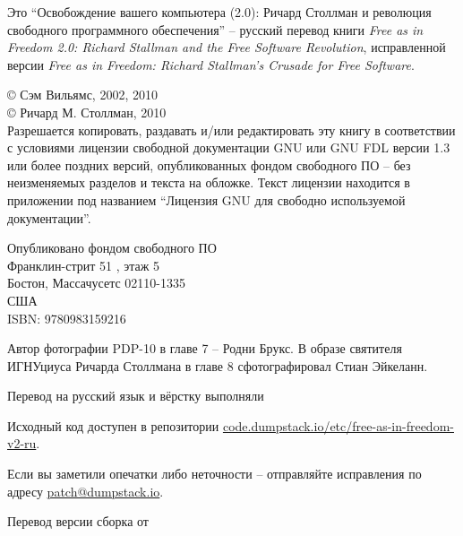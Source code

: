 \thispagestyle{plain}

\noindent Это \enquote{Освобождение вашего компьютера (2.0): Ричард Столлман и революция свободного программного обеспечения} -- русский перевод книги \textit{Free as in Freedom 2.0: Richard Stallman and the Free Software Revolution}, исправленной версии \textit{Free as in Freedom: Richard Stallman's Crusade for Free Software}.

\bigskip

\noindent \copyright{} Сэм Вильямс, 2002, 2010\\
\copyright{} Ричард М. Столлман, 2010\\

Разрешается копировать, раздавать и/или редактировать эту книгу в соответствии с условиями лицензии свободной документации GNU или GNU FDL версии 1.3 или более поздних версий, опубликованных фондом свободного ПО -- без неизменяемых разделов и текста на обложке. Текст лицензии находится в приложении под названием \enquote{Лицензия GNU для свободно используемой документации}.

\bigskip

\noindent Опубликовано фондом свободного ПО\\
Франклин-стрит 51 , этаж 5\\
Бостон, Массачусетс 02110-1335\\
США\\
ISBN: 9780983159216\\

\bigskip

\noindent Автор фотографии PDP-10 в главе 7 -- Родни Брукс. В образе святителя ИГНУциуса Ричарда Столлмана в главе 8 сфотографировал Стиан Эйкеланн.

\bigskip

Перевод на русский язык и вёрстку выполняли 

Исходный код доступен в репозитории
\href{https://code.dumpstack.io/etc/free-as-in-freedom-v2-ru}{code.dumpstack.io/etc/free-as-in-freedom-v2-ru}.

Если вы заметили опечатки либо неточности -- отправляйте исправления по адресу
\href{mailto:patch@dumpstack.io}{patch@dumpstack.io}.

Перевод версии  сборка от 

\theendnotes
\setcounter{endnote}{0}
